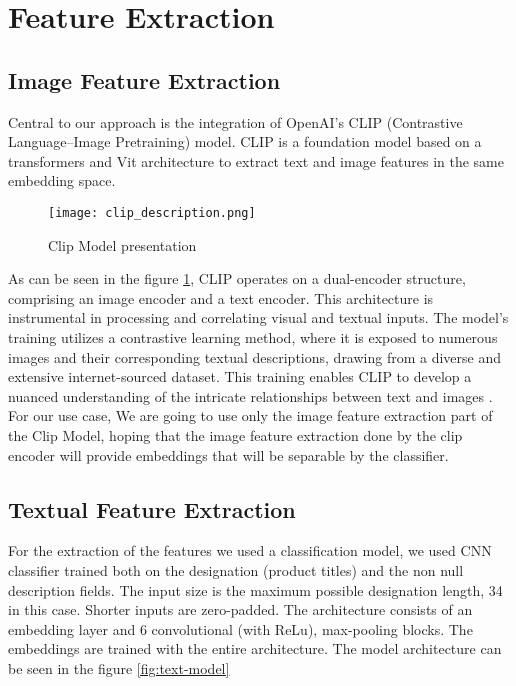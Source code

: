 
\section{Feature Extraction}

\subsection{Image Feature Extraction}

Central to our approach is the integration of OpenAI's CLIP (Contrastive Language–Image Pretraining) model. CLIP is a foundation model based on a transformers and Vit architecture to extract text and image features in the same embedding space.


\begin{figure}[H]
    \centering
    \texttt{[image: clip\_description.png]}
    \caption{\label{fig:clip-architecture}Clip Model presentation}
\end{figure}


As can be seen in the figure \ref{fig:clip-architecture}, CLIP operates on a dual-encoder structure, comprising an image encoder and a text encoder. This architecture is instrumental in processing and correlating visual and textual inputs. The model's training utilizes a contrastive learning method, where it is exposed to numerous images and their corresponding textual descriptions, drawing from a diverse and extensive internet-sourced dataset. This training enables CLIP to develop a nuanced understanding of the intricate relationships between text and images \cite{radford-2021}.
For our use case, We are going to use only the image feature extraction part of the Clip Model, hoping that the image feature extraction done by the clip encoder will provide embeddings that will be separable by the classifier.




\subsection{Textual Feature Extraction}

For the extraction of the features we used a classification model, we used CNN classifier trained both on the designation (product titles) and the non null description fields. The input size is the maximum possible designation length, 34 in this case. Shorter inputs are zero-padded. The architecture consists of an embedding layer and 6 convolutional (with ReLu), max-pooling blocks. The embeddings are trained with the entire architecture. The model architecture can be seen in the figure \ref{fig:text-model}

